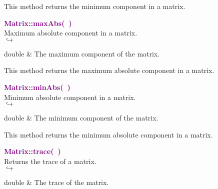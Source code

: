 This method returns the minimum component in a matrix.

\textcolor{purple}{\textbf{Matrix::maxAbs(~)}}\label{Matrix::maxAbs()}\\
Maximum absolute component in a matrix.\\ \hspace*{5mm}$\hookrightarrow$
\vspace*{-2em}\begin{tcolorbox}[grow to left by=-1cm, width=\textwidth-1cm,myArgs,tabularx={l|R}]
double & The maximum component of the matrix.
\end{tcolorbox}

This method returns the maximum absolute component in a matrix.

\textcolor{purple}{\textbf{Matrix::minAbs(~)}}\label{Matrix::minAbs()}\\
Minimum absolute component in a matrix.\\ \hspace*{5mm}$\hookrightarrow$
\vspace*{-2em}\begin{tcolorbox}[grow to left by=-1cm, width=\textwidth-1cm,myArgs,tabularx={l|R}]
double & The minimum component of the matrix.
\end{tcolorbox}

This method returns the minimum absolute component in a matrix.

\textcolor{purple}{\textbf{Matrix::trace(~)}}\label{Matrix::trace()}\\
Returns the trace of a matrix.\\ \hspace*{5mm}$\hookrightarrow$
\vspace*{-2em}\begin{tcolorbox}[grow to left by=-1cm, width=\textwidth-1cm,myArgs,tabularx={l|R}]
double & The trace of the matrix.
\end{tcolorbox}


